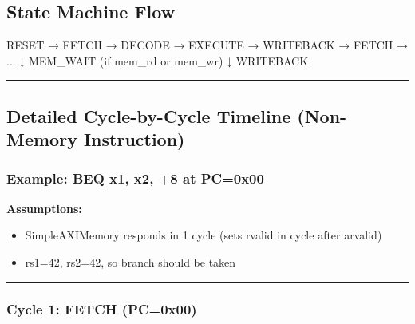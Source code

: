 \subsection{State Machine Flow}\label{cr:fix:timing-analysis:state-machine-flow}

\begin{record}

\begin{textblock}
RESET → FETCH → DECODE → EXECUTE → WRITEBACK → FETCH → ...
                                 ↓
                           MEM_WAIT (if mem_rd or mem_wr)
                                 ↓
                           WRITEBACK
\end{textblock}

\begin{center}\rule{0.5\linewidth}{0.5pt}\end{center}

\end{record}

\subsection{Detailed Cycle-by-Cycle Timeline (Non-Memory Instruction)}\label{cr:fix:timing-analysis:detailed-cycle-by-cycle-timeline-non-memory-instruction}

\subsubsection{Example: BEQ x1, x2, +8 at PC=0x00}\label{cr:fix:timing-analysis:example-beq-x1-x2-8-at-pc0x00}

\begin{record}

\textbf{Assumptions:}

\begin{itemize}
\tightlist
\item
  SimpleAXIMemory responds in 1 cycle (sets rvalid in cycle after
  arvalid)
\item
  rs1=42, rs2=42, so branch should be taken
\end{itemize}

\begin{center}\rule{0.5\linewidth}{0.5pt}\end{center}

\end{record}

\subsubsection{Cycle 1: FETCH (PC=0x00)}\label{cr:fix:timing-analysis:cycle-1-fetch-pc0x00}

